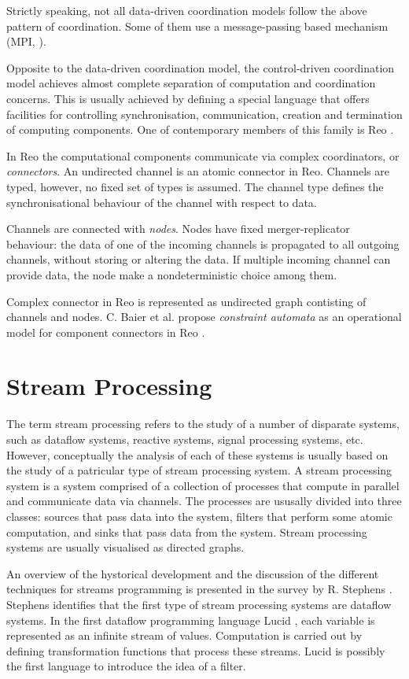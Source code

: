Strictly speaking, not all data-driven coordination models follow the above pattern of coordination. Some of them use a message-passing based mechanism (MPI, \cite{mpi}).

Opposite to the data-driven coordination model, the control-driven coordination model achieves almost complete separation of computation and coordination concerns. This is usually achieved by defining a special language that offers facilities for controlling synchronisation, communication, creation and termination of computing components. One of contemporary members of this family is Reo \cite{Reo_Arbab04}.

In Reo the computational components communicate via complex coordinators, or \emph{connectors}. An undirected channel is an atomic connector in Reo. Channels are typed, however, no fixed set of types is assumed. The channel type defines the synchronisational behaviour of the channel with respect to data.

Channels are connected with \emph{nodes}. Nodes have fixed merger-replicator behaviour: the data of one of the incoming channels is propagated to all outgoing channels, without storing or altering the data. If multiple incoming channel can provide data, the node make a nondeterministic choice among them.

Complex connector in Reo is represented as undirected graph contisting of channels and nodes. C. Baier et al. propose \emph{constraint automata} as an operational model for component connectors in Reo \cite{baier_ca}.


    \section{Stream Processing}
The term stream processing refers to the study of a number of disparate systems, such as dataflow systems, reactive systems, signal processing systems, etc. However, conceptually the analysis of each of these systems is usually based on the study of a patricular type of stream processing system. A stream processing system is a system comprised of a collection of processes that compute in parallel and communicate data via channels. The processes are ususally divided into three classes: sources that pass data into the system, filters that perform some atomic computation, and sinks that pass data from the system. Stream processing systems are usually visualised as directed graphs.

An overview of the hystorical development and the discussion of the different techniques for streams programming is presented in the survey by R. Stephens \cite{stephens97}. Stephens identifies that the first type of stream processing systems are dataflow systems. In the first dataflow programming language Lucid \cite{lucid}, each variable is represented as an infinite stream of values. Computation is carried out by defining transformation functions that process these streams. Lucid is possibly the first language to introduce the idea of a filter.

